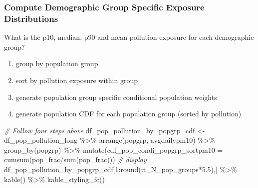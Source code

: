 \documentclass[
]{book}
\newenvironment{Shaded}{\begin{snugshade}}{\end{snugshade}}
\newcommand{\AttributeTok}[1]{\textcolor[rgb]{0.77,0.63,0.00}{#1}}
\newcommand{\CommentTok}[1]{\textcolor[rgb]{0.56,0.35,0.01}{\textit{#1}}}
\newcommand{\DecValTok}[1]{\textcolor[rgb]{0.00,0.00,0.81}{#1}}
\newcommand{\FloatTok}[1]{\textcolor[rgb]{0.00,0.00,0.81}{#1}}
\newcommand{\FunctionTok}[1]{\textcolor[rgb]{0.00,0.00,0.00}{#1}}
\newcommand{\NormalTok}[1]{#1}
\newcommand{\OtherTok}[1]{\textcolor[rgb]{0.56,0.35,0.01}{#1}}
\newcommand{\SpecialCharTok}[1]{\textcolor[rgb]{0.00,0.00,0.00}{#1}}
\providecommand{\tightlist}{%
  \setlength{\itemsep}{0pt}\setlength{\parskip}{0pt}}
\begin{document}
\hypertarget{compute-demographic-group-specific-exposure-distributions}{%
\subsubsection{Compute Demographic Group Specific Exposure Distributions}\label{compute-demographic-group-specific-exposure-distributions}}

What is the p10, median, p90 and mean pollution exposure for each demographic group?

\begin{enumerate}
\def\labelenumi{\arabic{enumi}.}
\tightlist
\item
  group by population group
\item
  sort by pollution exposure within group
\item
  generate population group specific conditional population weights
\item
  generate population CDF for each population group (sorted by pollution)
\end{enumerate}

\begin{Shaded}
\begin{Highlighting}[]
\CommentTok{\# Follow four steps above}
\NormalTok{df\_pop\_pollution\_by\_popgrp\_cdf }\OtherTok{\textless{}{-}}\NormalTok{ df\_pop\_pollution\_long }\SpecialCharTok{\%\textgreater{}\%}
  \FunctionTok{arrange}\NormalTok{(popgrp, avgdailypm10) }\SpecialCharTok{\%\textgreater{}\%}
  \FunctionTok{group\_by}\NormalTok{(popgrp) }\SpecialCharTok{\%\textgreater{}\%}
  \FunctionTok{mutate}\NormalTok{(}\AttributeTok{cdf\_pop\_condi\_popgrp\_sortpm10 =} \FunctionTok{cumsum}\NormalTok{(pop\_frac}\SpecialCharTok{/}\FunctionTok{sum}\NormalTok{(pop\_frac)))}
\CommentTok{\# display}
\NormalTok{df\_pop\_pollution\_by\_popgrp\_cdf[}\DecValTok{1}\SpecialCharTok{:}\FunctionTok{round}\NormalTok{(it\_N\_pop\_groups}\SpecialCharTok{*}\FloatTok{5.5}\NormalTok{),] }\SpecialCharTok{\%\textgreater{}\%} 
  \FunctionTok{kable}\NormalTok{() }\SpecialCharTok{\%\textgreater{}\%} \FunctionTok{kable\_styling\_fc}\NormalTok{()}
\end{Highlighting}
\end{Shaded}
\end{document}
